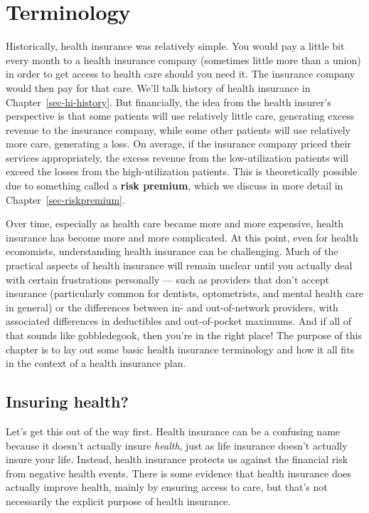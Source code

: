\documentclass[
  letterpaper,
  DIV=11,
  numbers=noendperiod]{scrreport}
\theoremstyle{definition}
\theoremstyle{remark}
\begin{document}
\hypertarget{terminology}{%
\chapter{Terminology}\label{terminology}}

Historically, health insurance was relatively simple. You would pay a
little bit every month to a health insurance company (sometimes little
more than a union) in order to get access to health care should you need
it. The insurance company would then pay for that care. We'll talk
history of health insurance in Chapter~\ref{sec-hi-history}. But
financially, the idea from the health insurer's perspective is that some
patients will use relatively little care, generating excess revenue to
the insurance company, while some other patients will use relatively
more care, generating a loss. On average, if the insurance company
priced their services appropriately, the excess revenue from the
low-utilization patients will exceed the losses from the
high-utilization patients. This is theoretically possible due to
something called a \textbf{risk premium}, which we discuss in more
detail in Chapter~\ref{sec-riskpremium}.

Over time, especially as health care became more and more expensive,
health insurance has become more and more complicated. At this point,
even for health economists, understanding health insurance can be
challenging. Much of the practical aspects of health insurance will
remain unclear until you actually deal with certain frustrations
personally --- such as providers that don't accept insurance
(particularly common for dentists, optometrists, and mental health care
in general) or the differences between in- and out-of-network providers,
with associated differences in deductibles and out-of-pocket maximums.
And if all of that sounds like gobbledegook, then you're in the right
place! The purpose of this chapter is to lay out some basic health
insurance terminology and how it all fits in the context of a health
insurance plan.

\hypertarget{insuring-health}{%
\section{Insuring health?}\label{insuring-health}}

Let's get this out of the way first. Health insurance can be a confusing
name because it doesn't actually insure \emph{health}, just as life
insurance doesn't actually insure your life. Instead, health insurance
protects us against the financial risk from negative health events.
There is some evidence that health insurance does actually improve
health, mainly by ensuring access to care, but that's not necessarily
the explicit purpose of health insurance.
\end{document}
